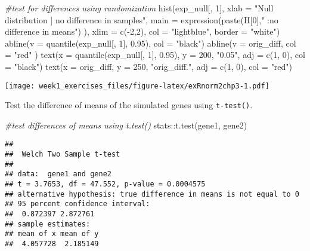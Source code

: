\documentclass[
]{article}
\newenvironment{Shaded}{\begin{snugshade}}{\end{snugshade}}
\newcommand{\AttributeTok}[1]{\textcolor[rgb]{0.77,0.63,0.00}{#1}}
\newcommand{\CommentTok}[1]{\textcolor[rgb]{0.56,0.35,0.01}{\textit{#1}}}
\newcommand{\DecValTok}[1]{\textcolor[rgb]{0.00,0.00,0.81}{#1}}
\newcommand{\FloatTok}[1]{\textcolor[rgb]{0.00,0.00,0.81}{#1}}
\newcommand{\FunctionTok}[1]{\textcolor[rgb]{0.00,0.00,0.00}{#1}}
\newcommand{\NormalTok}[1]{#1}
\newcommand{\SpecialCharTok}[1]{\textcolor[rgb]{0.00,0.00,0.00}{#1}}
\newcommand{\StringTok}[1]{\textcolor[rgb]{0.31,0.60,0.02}{#1}}
\begin{document}
\begin{Shaded}
\begin{Highlighting}[]
\CommentTok{\#test for differences using randomization}
\FunctionTok{hist}\NormalTok{(exp\_null[, }\DecValTok{1}\NormalTok{], }\AttributeTok{xlab =} \StringTok{"Null distribution | no difference in samples"}\NormalTok{,}
     \AttributeTok{main =} \FunctionTok{expression}\NormalTok{(}\FunctionTok{paste}\NormalTok{(H[}\DecValTok{0}\NormalTok{],}\StringTok{" :no difference in means"}\NormalTok{) ),}
     \AttributeTok{xlim =} \FunctionTok{c}\NormalTok{(}\SpecialCharTok{{-}}\DecValTok{2}\NormalTok{,}\DecValTok{2}\NormalTok{), }\AttributeTok{col =} \StringTok{"lightblue"}\NormalTok{, }\AttributeTok{border =} \StringTok{"white"}\NormalTok{)}
\FunctionTok{abline}\NormalTok{(}\AttributeTok{v =} \FunctionTok{quantile}\NormalTok{(exp\_null[, }\DecValTok{1}\NormalTok{], }\FloatTok{0.95}\NormalTok{), }\AttributeTok{col =} \StringTok{"black"}\NormalTok{)}
\FunctionTok{abline}\NormalTok{(}\AttributeTok{v =}\NormalTok{ orig\_diff, }\AttributeTok{col =} \StringTok{"red"}\NormalTok{ )}
\FunctionTok{text}\NormalTok{(}\AttributeTok{x =} \FunctionTok{quantile}\NormalTok{(exp\_null[, }\DecValTok{1}\NormalTok{], }\FloatTok{0.95}\NormalTok{), }\AttributeTok{y =} \DecValTok{200}\NormalTok{, }\StringTok{"0.05"}\NormalTok{, }\AttributeTok{adj =} \FunctionTok{c}\NormalTok{(}\DecValTok{1}\NormalTok{, }\DecValTok{0}\NormalTok{), }\AttributeTok{col =} \StringTok{"black"}\NormalTok{)}
\FunctionTok{text}\NormalTok{(}\AttributeTok{x =}\NormalTok{ orig\_diff, }\AttributeTok{y =} \DecValTok{250}\NormalTok{, }\StringTok{"orig\_diff."}\NormalTok{, }\AttributeTok{adj =} \FunctionTok{c}\NormalTok{(}\DecValTok{1}\NormalTok{, }\DecValTok{0}\NormalTok{), }\AttributeTok{col =} \StringTok{"red"}\NormalTok{)}
\end{Highlighting}
\end{Shaded}

\texttt{[image: week1\_exercises\_files/figure-latex/exRnorm2chp3-1.pdf]}

Test the difference of means of the simulated genes using
\texttt{t-test()}.

\begin{Shaded}
\begin{Highlighting}[]
\CommentTok{\#test differences of means using \textquotesingle{}t.test()\textquotesingle{}}
\NormalTok{stats}\SpecialCharTok{::}\FunctionTok{t.test}\NormalTok{(gene1, gene2)}
\end{Highlighting}
\end{Shaded}

\begin{verbatim}
## 
##  Welch Two Sample t-test
## 
## data:  gene1 and gene2
## t = 3.7653, df = 47.552, p-value = 0.0004575
## alternative hypothesis: true difference in means is not equal to 0
## 95 percent confidence interval:
##  0.872397 2.872761
## sample estimates:
## mean of x mean of y 
##  4.057728  2.185149
\end{verbatim}
\end{document}
